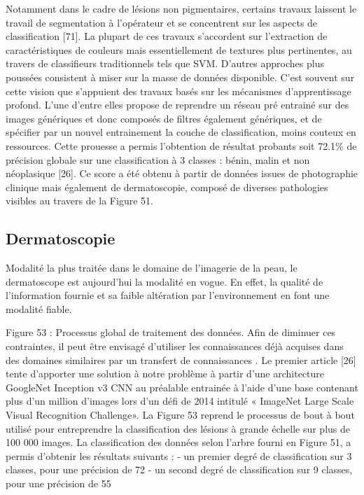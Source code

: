 Notamment dans le cadre de lésions non pigmentaires, certains travaux laissent le travail de segmentation à l’opérateur et se concentrent sur les aspects de classification [71]. La plupart de ces travaux s’accordent sur l’extraction de caractéristiques de couleurs mais essentiellement de textures plus pertinentes, au travers de classifieurs traditionnels tels que SVM.
D’autres approches plus poussées consistent à miser sur la masse de données disponible. C’est souvent sur cette vision que s’appuient des travaux basés sur les mécanismes d’apprentissage profond. L’une d’entre elles propose de reprendre un réseau pré entrainé sur des images génériques et donc composés de filtres également génériques, et de spécifier par un nouvel entrainement la couche de classification, moins couteux en ressources. Cette prouesse a permis l’obtention de résultat probants soit 72.1\% de précision globale sur une classification à 3 classes : bénin, malin et non néoplasique [26]. Ce score a été obtenu à partir de données issues de photographie clinique mais également de dermatoscopie, composé de diverses pathologies visibles au travers de la Figure 51.

\subsection{Dermatoscopie}
Modalité la plus traitée dans le domaine de l’imagerie de la peau, le dermatoscope est 	aujourd’hui la modalité en vogue. En effet, la qualité de l’information fournie et sa faible altération par l’environnement en font une modalité fiable.  
 
Figure 53 : Processus global de traitement des données.
Afin de diminuer ces contraintes, il peut être envisagé d’utiliser les connaissances déjà acquises dans des domaines similaires par un transfert de connaissances . Le premier article [26] tente d’apporter une solution à notre problème à partir d’une architecture GoogleNet Inception v3 CNN  au préalable entrainée à l’aide d’une base contenant plus d’un million d’images lors d’un défi de 2014 intitulé « ImageNet Large Scale Visual Recognition Challenge». La  Figure 53 reprend le processus de bout à bout utilisé pour entreprendre la classification des lésions à grande échelle sur plus de 100 000 images. La classification des données selon l’arbre fourni en Figure 51, a permis d’obtenir les résultats suivants :
- un premier degré de classification sur 3 classes, pour une précision de 72%
- un second degré de classification sur 9 classes, pour une précision de 55%

